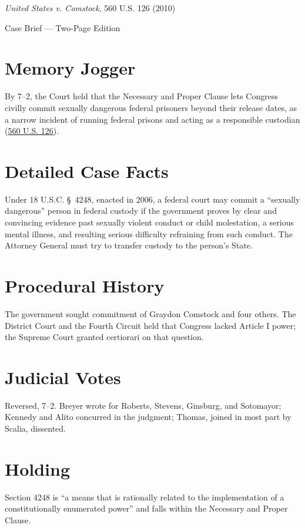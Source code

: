 \documentclass[12pt]{article}
\begin{document}
\begin{center}
{\LARGE \textit{United States v. Comstock}, 560 U.S. 126 (2010)\par}
\vspace{0.5em}
{\large Case Brief --- Two-Page Edition\par}
\end{center}

\section{Memory Jogger}
By 7--2, the Court held that the Necessary and Proper Clause lets Congress civilly commit sexually dangerous federal prisoners beyond their release dates, as a narrow incident of running federal prisons and acting as a responsible custodian (\href{https://supreme.justia.com/cases/federal/us/560/126/}{560 U.S. 126}).

\section{Detailed Case Facts}
Under 18 U.S.C. \S~4248, enacted in 2006, a federal court may commit a ``sexually dangerous'' person in federal custody if the government proves by clear and convincing evidence past sexually violent conduct or child molestation, a serious mental illness, and resulting serious difficulty refraining from such conduct. The Attorney General must try to transfer custody to the person's State.

\section{Procedural History}
The government sought commitment of Graydon Comstock and four others. The District Court and the Fourth Circuit held that Congress lacked Article I power; the Supreme Court granted certiorari on that question.

\section{Judicial Votes}
Reversed, 7--2. Breyer wrote for Roberts, Stevens, Ginsburg, and Sotomayor; Kennedy and Alito concurred in the judgment; Thomas, joined in most part by Scalia, dissented.

\section{Holding}
Section 4248 is ``a means that is rationally related to the implementation of a constitutionally enumerated power'' and falls within the Necessary and Proper Clause.
\end{document}

